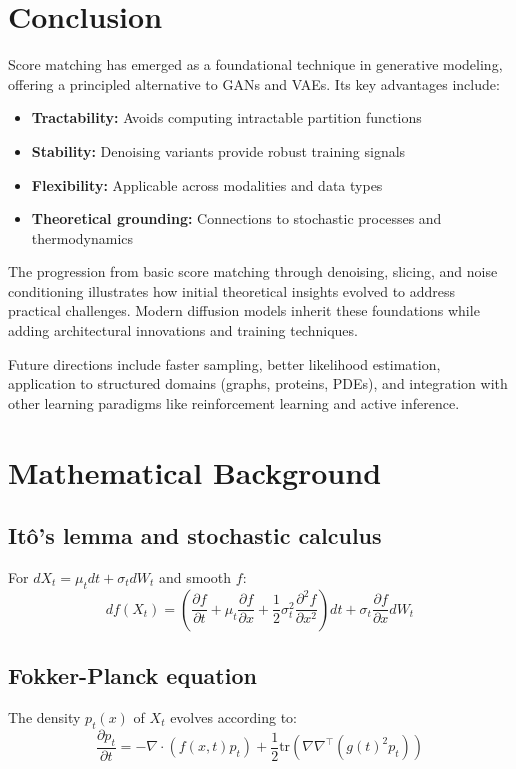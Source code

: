 \documentclass[11pt]{article}
\theoremstyle{definition}
\begin{document}
\section{Conclusion}

Score matching has emerged as a foundational technique in generative modeling, 
offering a principled alternative to GANs and VAEs. 
Its key advantages include:
\begin{itemize}
\item \textbf{Tractability:} Avoids computing intractable partition functions
\item \textbf{Stability:} Denoising variants provide robust training signals
\item \textbf{Flexibility:} Applicable across modalities and data types
\item \textbf{Theoretical grounding:} Connections to stochastic processes and thermodynamics
\end{itemize}

The progression from basic score matching through denoising, slicing, and noise conditioning 
illustrates how initial theoretical insights evolved to address practical challenges. 
Modern diffusion models inherit these foundations while adding architectural innovations and training techniques.

Future directions include faster sampling, better likelihood estimation, 
application to structured domains (graphs, proteins, PDEs), 
and integration with other learning paradigms like reinforcement learning and active inference.

\appendix

\section{Mathematical Background}

\subsection{Itô's lemma and stochastic calculus}
For $dX_t = \mu_t dt + \sigma_t dW_t$ and smooth $f$:
\begin{equation}
df(X_t) = \left(\frac{\partial f}{\partial t} + \mu_t \frac{\partial f}{\partial x} 
+ \frac{1}{2}\sigma_t^2 \frac{\partial^2 f}{\partial x^2}\right)dt 
+ \sigma_t \frac{\partial f}{\partial x} dW_t
\end{equation}

\subsection{Fokker-Planck equation}
The density $p_t(x)$ of $X_t$ evolves according to:
\begin{equation}
\frac{\partial p_t}{\partial t} 
= -\nabla \cdot (f(x,t) p_t) + \frac{1}{2}\text{tr}(\nabla\nabla^\top (g(t)^2 p_t))
\end{equation}
\end{document}
